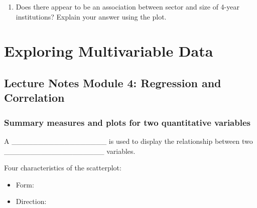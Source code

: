 \documentclass[
]{report}
\providecommand{\tightlist}{%
  \setlength{\itemsep}{0pt}\setlength{\parskip}{0pt}}
\begin{document}
\begin{enumerate}
\def\labelenumi{\arabic{enumi}.}
\setcounter{enumi}{15}
\tightlist
\item
  Does there appear to be an association between sector and size of 4-year institutions? Explain your answer using the plot.
\end{enumerate}

\vspace{0.5in}

\newpage

\hypertarget{exploring-multivariable-data}{%
\chapter{Exploring Multivariable Data}\label{exploring-multivariable-data}}

\hypertarget{lecture-notes-module-4-regression-and-correlation}{%
\section{Lecture Notes Module 4: Regression and Correlation}\label{lecture-notes-module-4-regression-and-correlation}}


\hypertarget{summary-measures-and-plots-for-two-quantitative-variables}{%
\subsection*{Summary measures and plots for two quantitative variables}\label{summary-measures-and-plots-for-two-quantitative-variables}}


A \_\_\_\_\_\_\_\_\_\_\_\_\_\_\_\_\_\_ is used to display the relationship
between two \_\_\_\_\_\_\_\_\_\_\_\_\_\_\_\_\_\_\_ variables.


Four characteristics of the scatterplot:

\begin{itemize}
\tightlist
\item
  Form:
\end{itemize}

\vspace{0.2in}

\begin{itemize}
\tightlist
\item
  Direction:
\end{itemize}
\end{document}
